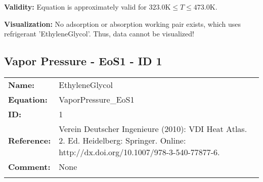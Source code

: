 \textbf{Validity:}
\newline
Equation is approximately valid for $323.0 \si{\kelvin} \leq T \leq 473.0 \si{\kelvin}$.
\newline

\textbf{Visualization:}
%
\newline
No adsorption or absorption working pair exists, which uses refrigerant 'EthyleneGlycol'. Thus, data cannot be visualized!
%

\FloatBarrier
\newpage
\subsection{Vapor Pressure - EoS1 - ID 1}
%
\begin{tabular}[l]{|lp{11.5cm}|}
\hline
\addlinespace

\textbf{Name:} & EthyleneGlycol \\
\textbf{Equation:} & VaporPressure\_EoS1 \\
\textbf{ID:} & 1 \\
\textbf{Reference:} & Verein Deutscher Ingenieure (2010): VDI Heat Atlas. 2. Ed. Heidelberg: Springer. Online: http://dx.doi.org/10.1007/978-3-540-77877-6. \\
\textbf{Comment:} & None \\

\addlinespace
\hline
\end{tabular}
\newline

